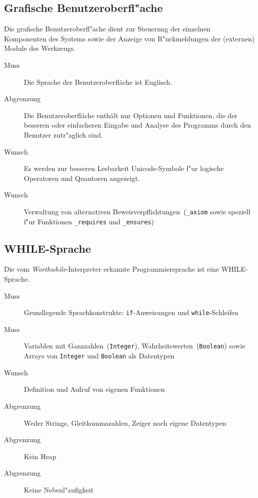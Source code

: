 \subsection{Grafische Benutzeroberfl"ache}%

Die grafische Benutzeroberfl"ache dient zur Steuerung der einzelnen Komponenten des Systems sowie der Anzeige von R"uckmeldungen der (externen) \see Module des Werkzeugs.%

\begin{description}%
    \item [Muss] Die Sprache der Benutzeroberfläche ist Englisch.%
    \item [Abgrenzung] Die Benutzeroberfläche enthält nur Optionen und Funktionen, die der besseren oder einfacheren Eingabe und Analyse des Programms durch den Benutzer zutr"aglich sind.%
    \item [Wunsch] Es werden zur besseren Lesbarkeit \see Unicode-Symbole f"ur \see logische Operatoren und Quantoren angezeigt.%
    \item [Wunsch] Verwaltung von alternativen \see Beweisverpflichtungen~(\texttt{\_axiom} sowie speziell f"ur Funktionen \texttt{\_requires} und \texttt{\_ensures})%
\end{description}%

\subsection{WHILE-Sprache}%

Die vom \textit{Worthwhile}-Interpreter erkannte Programmiersprache ist eine \see WHILE-Sprache.%

\begin{description}%
    \item [Muss] Grundlegende Sprachkonstrukte: \texttt{if}-Anweisungen und \texttt{while}-Schleifen%
    \item [Muss] Variablen mit Ganzzahlen~(\texttt{Integer}), Wahrheitswerten~(\texttt{Boolean}) sowie Arrays von \texttt{Integer} und \texttt{Boolean} als Datentypen%
    \item [Wunsch] Definition und Aufruf von eigenen Funktionen%
    \item [Abgrenzung] Weder Strings, Gleitkommazahlen, Zeiger noch eigene Datentypen%
    \item [Abgrenzung] Kein \see Heap%
    \item [Abgrenzung] Keine \see Nebenl"aufigkeit%
\end{description}%

